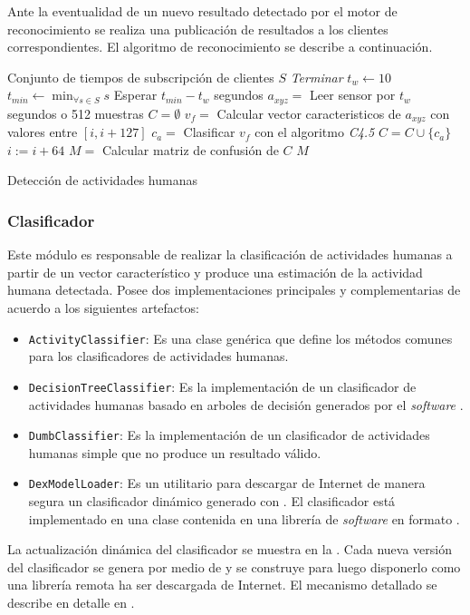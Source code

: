 Ante la eventualidad de un nuevo resultado detectado por el motor
de reconocimiento se realiza una publicación de resultados a los clientes
correspondientes. El algoritmo de reconocimiento se describe a continuación.

\begin{algorithm}[h]
\begin{algorithmic}[1]
    \Require Conjunto de tiempos de subscripción de clientes $S$
 			\State\textit{Terminar}
		\EndIf
		\State $t_w \leftarrow 10$
		\State $t_{min} \leftarrow \min_{\forall s \in S} s$
		\State Esperar $t_{min} - t_w$ segundos 
		\State $ a_{xyz} = $ Leer sensor por $t_w$ segundos o 512 muestras
		\State $ C = \emptyset$
			\State $ v_f = $ Calcular vector caracteristicos de $a_{xyz}$ con valores entre $[i, i + 127]$
			\State $ c_a = $ Clasificar $v_f$ con el algoritmo \textit{C4.5}
			\State $ C = C \cup \{c_a\}$ 
			\State $i := i + 64$
        \EndFor
        \State $ M = $ Calcular matriz de confusión de $C$ 
		\State
		\Return $ M $
	\EndProcedure
\end{algorithmic}

\caption{\label{alg5:reconocimiento}Detección de actividades humanas}
\end{algorithm}


\subsubsection{Clasificador}

Este módulo es responsable de realizar la clasificación de actividades
humanas a partir de un vector característico y produce una estimación
de la actividad humana detectada. Posee dos implementaciones principales
y complementarias de acuerdo a los siguientes artefactos:
\begin{itemize}
\item \texttt{\small{}ActivityClassifier}: Es una clase genérica que define
los métodos comunes para los clasificadores de actividades humanas.
\item \texttt{\small{}DecisionTreeClassifier}: Es la implementación de un
clasificador de actividades humanas basado en arboles de decisión
generados por el \emph{software} \texttt{} \cite{Frank2016}.
\item \texttt{\small{}DumbClassifier}: Es la implementación de un clasificador
de actividades humanas simple que no produce un resultado válido.
\item \texttt{\small{}DexModelLoader}: Es un utilitario para descargar de
Internet de manera segura un clasificador dinámico generado con .
El clasificador está implementado en una clase contenida en una librería
de \emph{software} en formato .
\end{itemize}
La actualización dinámica del clasificador se muestra en la .
Cada nueva versión del clasificador se genera por medio de 
y se construye para luego disponerlo como una librería remota ha ser
descargada de Internet. El mecanismo detallado se describe en detalle
en \cite{Falsina2014}.

